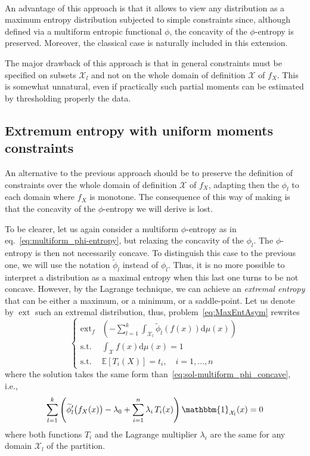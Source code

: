 \documentclass[english]{elsarticle}
\theoremstyle{definition}
\theoremstyle{plain}
\theoremstyle{plain}
\def\dmu{\mathrm{d}\mu}
\def\X{\mathcal{X}}
\def\un{\mathbbm{1}}
\def\ext{\operatorname{ext}}
\newcommand{\Esp}[1]{\mathbb{E}\left[ #1 \right]}
\begin{document}
\

An advantage of  this approach is that  it allows to view any  distribution as a
maximum  entropy distribution  subjected to  simple constraints  since, although
defined  via  a multiform  entropic  functional  $\phi$,  the concavity  of  the
$\phi$-entropy is preserved. Moreover,  the classical case is naturally included
in this extension.

The  major drawback  of this  approach is  that in  general constraints  must be
specified on  subsets $\X_l$ and not on  the whole domain of  definition $\X$ of
$f_X$. This is somewhat unnatural,  even if practically such partial moments can
be estimated by thresholding properly the data.




\subsection{Extremum entropy with uniform moments constraints}

\label{subsec:ExtremalPhiEnt}

An alternative to the previous approach  should be to preserve the definition of
constraints over the whole domain of definition $\X$ of $f_X$, adapting then the
$\phi_l$ to each domain where $f_X$  is monotone. The consequence of this way of
making is that the concavity of the $\phi$-entropy we will derive is lost.

To  be  clearer,  let  us  again  consider  a  multiform  $\phi$-entropy  as  in
eq.~\eqref{eq:multiform_phi-entropy},   but  relaxing   the  concavity   of  the
$\phi_l$. The  $\phi$-entropy is then  not necessarily concave.   To distinguish
this case  to the  previous one, we  will use the  notation $\widetilde{\phi}_l$
instead of $\phi_l$.   Thus, it is no more possible  to interpret a distribution
as a maximal entropy when this last one turns to be not concave. However, by the
Lagrange technique, we can achieve an  {\em extremal entropy} that can be either
a maximum,  or a minimum,  or a  saddle-point. Let us  denote by $\ext$  such an
extremal distribution, thus, problem~\ref{eq:MaxEntAsym} rewrites
\begin{equation}\label{eq:ExtEntMulti}
\begin{cases}
\ext_{f} & \displaystyle \left( - \sum_{l=1}^k \int_{\X_l}
\widetilde{\phi}_l(f(x)) \dmu(x) \right)
\\[7.5mm]
\text{s.t. } & {\displaystyle \int_\X f(x) \dmu(x) = 1}\\[5mm]
\text{s.t. } & \Esp{T_i(X)} = t_i , \quad i = 1 , \ldots , n
\end{cases}
\end{equation}
where the solution takes the same form than~\eqref{eq:sol-multiform_phi_concave}, i.e.,
\begin{equation}\label{eq:sol-multiform_phi_notconcave}
\sum_{l=1}^k \left( \widetilde{\phi}_l'\big(f_X(x)\big) - \lambda_0 +
\sum_{i=1}^n \lambda_i \, T_i(x) \right) \un_{\X_{l}}(x) = 0
\end{equation}
where both functions $T_i$ and  the Lagrange multiplier $\lambda_i$ are the same
for any domain $\X_l$ of the partition.
\end{document}
